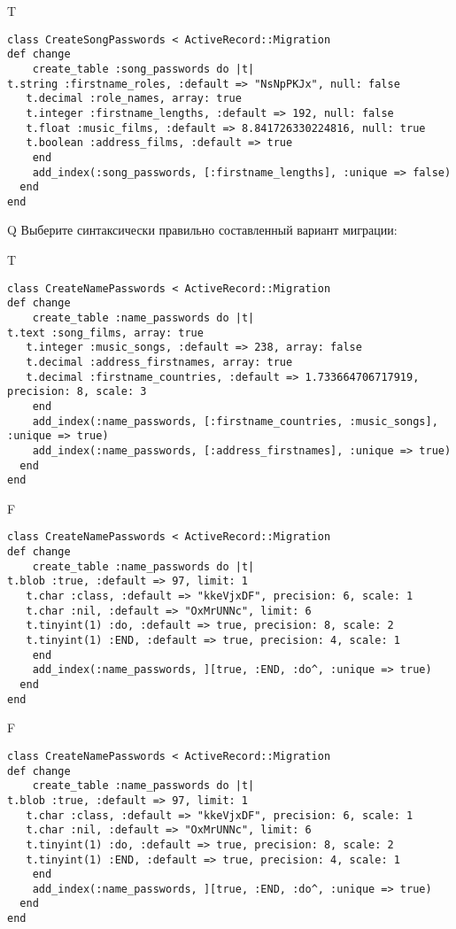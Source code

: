 T
\begin{verbatim}
class CreateSongPasswords < ActiveRecord::Migration
def change
	create_table :song_passwords do |t|
t.string :firstname_roles, :default => "NsNpPKJx", null: false
   t.decimal :role_names, array: true
   t.integer :firstname_lengths, :default => 192, null: false
   t.float :music_films, :default => 8.841726330224816, null: true
   t.boolean :address_films, :default => true
   	end
	add_index(:song_passwords, [:firstname_lengths], :unique => false)
  end 
end

\end{verbatim}

Q
Выберите синтаксически правильно составленный вариант миграции:

T
\begin{verbatim}
class CreateNamePasswords < ActiveRecord::Migration
def change
	create_table :name_passwords do |t|
t.text :song_films, array: true
   t.integer :music_songs, :default => 238, array: false
   t.decimal :address_firstnames, array: true
   t.decimal :firstname_countries, :default => 1.733664706717919, precision: 8, scale: 3
   	end
	add_index(:name_passwords, [:firstname_countries, :music_songs], :unique => true)
 	add_index(:name_passwords, [:address_firstnames], :unique => true)
  end 
end

\end{verbatim}

F
\begin{verbatim}
class CreateNamePasswords < ActiveRecord::Migration
def change
	create_table :name_passwords do |t|
t.blob :true, :default => 97, limit: 1
   t.char :class, :default => "kkeVjxDF", precision: 6, scale: 1
   t.char :nil, :default => "OxMrUNNc", limit: 6
   t.tinyint(1) :do, :default => true, precision: 8, scale: 2
   t.tinyint(1) :END, :default => true, precision: 4, scale: 1
   	end
	add_index(:name_passwords, ][true, :END, :do^, :unique => true)
  end 
end

\end{verbatim}

F
\begin{verbatim}
class CreateNamePasswords < ActiveRecord::Migration
def change
	create_table :name_passwords do |t|
t.blob :true, :default => 97, limit: 1
   t.char :class, :default => "kkeVjxDF", precision: 6, scale: 1
   t.char :nil, :default => "OxMrUNNc", limit: 6
   t.tinyint(1) :do, :default => true, precision: 8, scale: 2
   t.tinyint(1) :END, :default => true, precision: 4, scale: 1
   	end
	add_index(:name_passwords, ][true, :END, :do^, :unique => true)
  end 
end

\end{verbatim}

